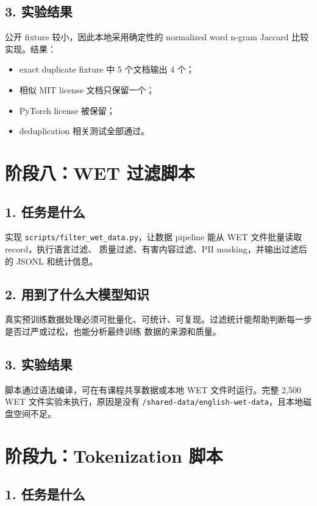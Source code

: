 \documentclass[UTF8,11pt]{ctexart}
\begin{document}
\subsection*{3. 实验结果}

公开 fixture 较小，因此本地采用确定性的 normalized word n-gram Jaccard 比较实现。结果：

\begin{itemize}
  \item exact duplicate fixture 中 5 个文档输出 4 个；
  \item 相似 MIT license 文档只保留一个；
  \item PyTorch license 被保留；
  \item deduplication 相关测试全部通过。
\end{itemize}

\section{阶段八：WET 过滤脚本}

\subsection*{1. 任务是什么}

实现 \texttt{scripts/filter\_wet\_data.py}，让数据 pipeline 能从 WET 文件批量读取 record，执行语言过滤、
质量过滤、有害内容过滤、PII masking，并输出过滤后的 JSONL 和统计信息。

\subsection*{2. 用到了什么大模型知识}

真实预训练数据处理必须可批量化、可统计、可复现。过滤统计能帮助判断每一步是否过严或过松，也能分析最终训练
数据的来源和质量。

\subsection*{3. 实验结果}

脚本通过语法编译，可在有课程共享数据或本地 WET 文件时运行。完整 2,500 WET 文件实验未执行，原因是没有
\texttt{/shared-data/english-wet-data}，且本地磁盘空间不足。

\section{阶段九：Tokenization 脚本}

\subsection*{1. 任务是什么}
\end{document}
